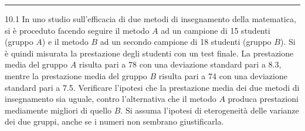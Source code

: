 \documentclass[
  11pt,
]{book}
\theoremstyle{mytheoremstyle}
\theoremstyle{mydefstyle}
\begin{document}
\begin{center}\rule{0.5\linewidth}{0.5pt}\end{center}

10.1 In uno studio sull'efficacia di due metodi di insegnamento della matematica, si è proceduto facendo seguire il metodo \(A\) ad un campione di 15 studenti (gruppo \(A\)) e il metodo \(B\) ad un secondo campione di 18 studenti (gruppo \(B\)). Si è quindi misurata la prestazione degli studenti con un test finale. La prestazione media del gruppo \(A\) risulta pari a 78 con una deviazione standard pari a 8.3, mentre la prestazione media del gruppo \(B\) risulta pari a 74 con una deviazione standard pari a 7.5. Verificare l'ipotesi che la prestazione media dei due metodi di insegnamento sia uguale, contro l'alternativa che il metodo \(A\) produca prestazioni mediamente migliori di quello \(B\). Si assuma l'ipotesi di eterogeneità delle varianze dei due gruppi, anche se i numeri non sembrano giustificarla.
\end{document}
